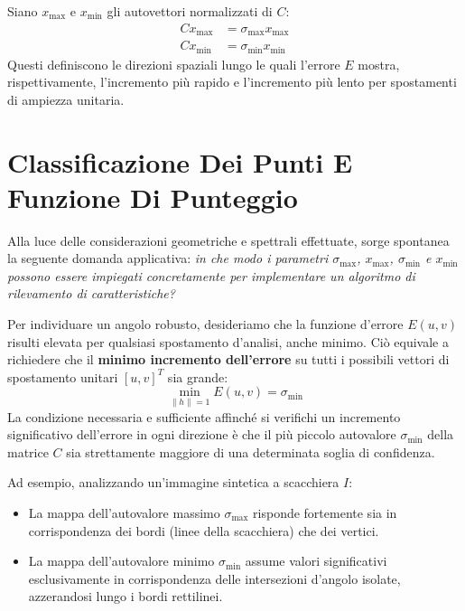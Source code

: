 ﻿\documentclass[11pt, a4paper]{article}
\begin{document}

Siano $x_{\max}$ e $x_{\min}$ gli autovettori normalizzati di $C$:
\begin{align*}
    C x_{\max} &= \sigma_{\max} x_{\max} \\
    C x_{\min} &= \sigma_{\min} x_{\min}
\end{align*}
Questi definiscono le direzioni spaziali lungo le quali l'errore $E$ mostra, rispettivamente, l'incremento più rapido e l'incremento più lento per spostamenti di ampiezza unitaria.

\newpage

\section{Classificazione Dei Punti E Funzione Di Punteggio}

Alla luce delle considerazioni geometriche e spettrali effettuate, sorge spontanea la seguente domanda applicativa: \emph{in che modo i parametri $\sigma_{\max}$, $x_{\max}$, $\sigma_{\min}$ e $x_{\min}$ possono essere impiegati concretamente per implementare un algoritmo di rilevamento di caratteristiche?}

Per individuare un angolo robusto, desideriamo che la funzione d'errore $E(u,v)$ risulti elevata per qualsiasi spostamento d'analisi, anche minimo. Ciò equivale a richiedere che il \textbf{minimo incremento dell'errore} su tutti i possibili vettori di spostamento unitari $[u, v]^T$ sia grande:
\begin{equation}
    \min_{\|h\|=1} E(u, v) = \sigma_{\min}
    \label{eq:min_eigenvalue}
\end{equation}
La condizione necessaria e sufficiente affinché si verifichi un incremento significativo dell'errore in ogni direzione è che il più piccolo autovalore $\sigma_{\min}$ della matrice $C$ sia strettamente maggiore di una determinata soglia di confidenza.


Ad esempio, analizzando un'immagine sintetica a scacchiera $I$:
\begin{itemize}[noitemsep]
    \item La mappa dell'autovalore massimo $\sigma_{\max}$ risponde fortemente sia in corrispondenza dei bordi (linee della scacchiera) che dei vertici.
    \item La mappa dell'autovalore minimo $\sigma_{\min}$ assume valori significativi esclusivamente in corrispondenza delle intersezioni d'angolo isolate, azzerandosi lungo i bordi rettilinei.
\end{itemize}
\end{document}
